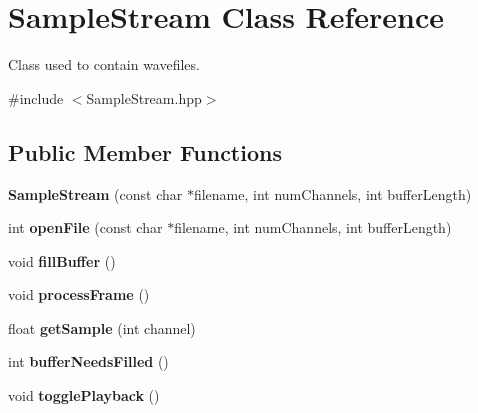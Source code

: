 \hypertarget{class_sample_stream}{}\section{Sample\+Stream Class Reference}
\label{class_sample_stream}


Class used to contain wavefiles.  




{\ttfamily \#include $<$Sample\+Stream.\+hpp$>$}

\subsection*{Public Member Functions}
\begin{DoxyCompactItemize}
\item 
\mbox{\label{class_sample_stream_aa725535c36cb17417a49d3bf85fc2b11}} 
{\bfseries Sample\+Stream} (const char $\ast$filename, int num\+Channels, int buffer\+Length)
\item 
\mbox{\label{class_sample_stream_a6842a7de97533d9a1f5c00f3a40abf22}} 
int {\bfseries open\+File} (const char $\ast$filename, int num\+Channels, int buffer\+Length)
\item 
\mbox{\label{class_sample_stream_a732619a980e61fbc8d2470e77e44ad62}} 
void {\bfseries fill\+Buffer} ()
\item 
\mbox{\label{class_sample_stream_a20072eef6ad40286cded88b57b3d6fc4}} 
void {\bfseries process\+Frame} ()
\item 
\mbox{\label{class_sample_stream_a2f0476f31bd7301beb6b8c511b72ca11}} 
float {\bfseries get\+Sample} (int channel)
\item 
\mbox{\label{class_sample_stream_ada68993caf94bfa0e5d951c7245bb7e9}} 
int {\bfseries buffer\+Needs\+Filled} ()
\item 
\mbox{\label{class_sample_stream_a1f1ea856ea91d20b6c9343ea0b8d87ab}} 
void {\bfseries toggle\+Playback} ()
\item 
\mbox{\label{class_sample_stream_a6fea98dbac202f83cd00187de33cb23b}} 

\end{DoxyCompactItemize}
